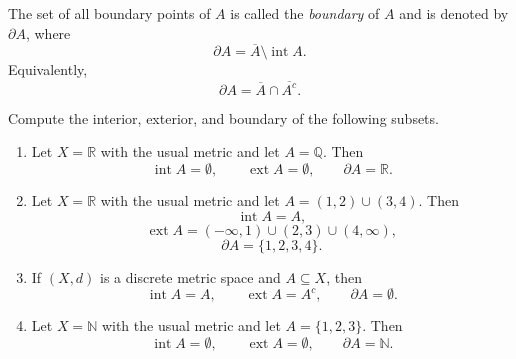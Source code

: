\documentclass[12pt, a4paper]{article}
\begin{document}
\vspace{150pt}

\begin{definition}
The set of all boundary points of $A$ is called the \emph{boundary} of $A$
and is denoted by $\partial A$, where
\[
\partial A=\overline{A}\setminus \operatorname{int}A.
\]
Equivalently,
\[
\partial A=\overline{A}\cap \overline{A^c}.
\]
\end{definition}

\clearpage

\begin{problem}
Compute the interior, exterior, and boundary of the following subsets.

\begin{enumerate}
    \item Let $X=\mathbb{R}$ with the usual metric and let $A=\mathbb{Q}$. Then
    \[
    \operatorname{int}A=\emptyset,\qquad
    \operatorname{ext}A=\emptyset,\qquad
    \partial A=\mathbb{R}.
    \]

    \item Let $X=\mathbb{R}$ with the usual metric and let
    \(
    A=(1,2)\cup(3,4).
    \)
    Then
    \[
    \operatorname{int}A=A,
    \]
    \[
    \operatorname{ext}A=(-\infty,1)\cup(2,3)\cup(4,\infty),
    \]
    \[
    \partial A=\{1,2,3,4\}.
    \]

    \item If $(X,d)$ is a discrete metric space and $A\subseteq X$, then
    \[
    \operatorname{int}A=A,\qquad
    \operatorname{ext}A=A^c,\qquad
    \partial A=\emptyset.
    \]

    \item Let $X=\mathbb{N}$ with the usual metric and let $A=\{1,2,3\}$. Then
    \[
    \operatorname{int}A=\emptyset,\qquad
    \operatorname{ext}A=\emptyset,\qquad
    \partial A=\mathbb{N}.
    \]
\end{enumerate}
\end{problem}

\clearpage
\end{document}
